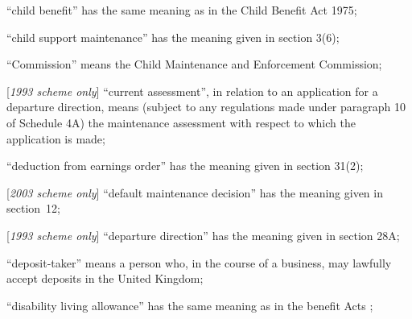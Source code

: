 \documentclass[12pt,a4paper]{article}
\begin{document}
\begin{enumerate}


    “child benefit” has the same meaning as in the Child Benefit Act 1975;


    “child support maintenance” has the meaning given in section 3(6);


“Commission” means the Child Maintenance and Enforcement Commission;

[\emph{1993 scheme only}]     “current assessment”, in relation to an application for a departure direction, means (subject to any regulations made under paragraph 10 of Schedule 4A) the maintenance assessment with respect to which the application is made;

    “deduction from earnings order” has the meaning given in section 31(2);

[\emph{2003 scheme only}] “default maintenance decision” has the meaning given in section~12;

[\emph{1993 scheme only}]     “departure direction” has the meaning given in section 28A;

“deposit-taker” means a person who, in the course of a business, may lawfully accept deposits in the United Kingdom;

    “disability living allowance” has the same meaning as in the 
benefit Acts%
;


\end{enumerate}
\end{document}
